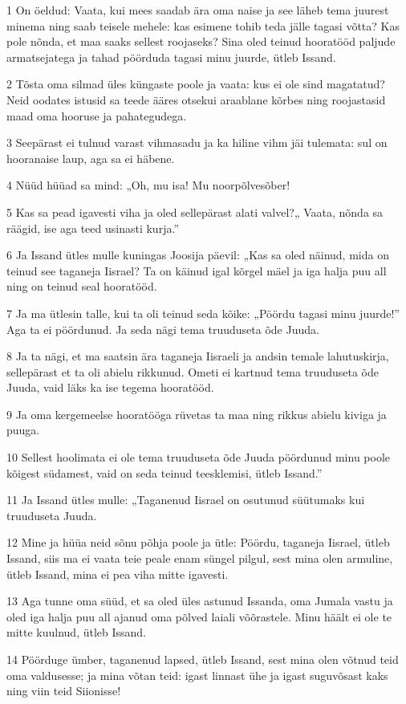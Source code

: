 \par 1 On öeldud: Vaata, kui mees saadab ära oma naise ja see läheb tema juurest minema ning saab teisele mehele: kas esimene tohib teda jälle tagasi võtta? Kas pole nõnda, et maa saaks sellest roojaseks? Sina oled teinud hooratööd paljude armatsejatega ja tahad pöörduda tagasi minu juurde, ütleb Issand.
\par 2 Tõsta oma silmad üles küngaste poole ja vaata: kus ei ole sind magatatud? Neid oodates istusid sa teede ääres otsekui araablane kõrbes ning roojastasid maad oma hooruse ja pahategudega.
\par 3 Seepärast ei tulnud varast vihmasadu ja ka hiline vihm jäi tulemata: sul on hooranaise laup, aga sa ei häbene.
\par 4 Nüüd hüüad sa mind: „Oh, mu isa! Mu noorpõlvesõber!
\par 5 Kas sa pead igavesti viha ja oled sellepärast alati valvel?„ Vaata, nõnda sa räägid, ise aga teed usinasti kurja.”
\par 6 Ja Issand ütles mulle kuningas Joosija päevil: „Kas sa oled näinud, mida on teinud see taganeja Iisrael? Ta on käinud igal kõrgel mäel ja iga halja puu all ning on teinud seal hooratööd.
\par 7 Ja ma ütlesin talle, kui ta oli teinud seda kõike: „Pöördu tagasi minu juurde!” Aga ta ei pöördunud. Ja seda nägi tema truuduseta õde Juuda.
\par 8 Ja ta nägi, et ma saatsin ära taganeja Iisraeli ja andsin temale lahutuskirja, sellepärast et ta oli abielu rikkunud. Ometi ei kartnud tema truuduseta õde Juuda, vaid läks ka ise tegema hooratööd.
\par 9 Ja oma kergemeelse hooratööga rüvetas ta maa ning rikkus abielu kiviga ja puuga.
\par 10 Sellest hoolimata ei ole tema truuduseta õde Juuda pöördunud minu poole kõigest südamest, vaid on seda teinud teesklemisi, ütleb Issand.”
\par 11 Ja Issand ütles mulle: „Taganenud Iisrael on osutunud süütumaks kui truuduseta Juuda.
\par 12 Mine ja hüüa neid sõnu põhja poole ja ütle: Pöördu, taganeja Iisrael, ütleb Issand, siis ma ei vaata teie peale enam süngel pilgul, sest mina olen armuline, ütleb Issand, mina ei pea viha mitte igavesti.
\par 13 Aga tunne oma süüd, et sa oled üles astunud Issanda, oma Jumala vastu ja oled iga halja puu all ajanud oma põlved laiali võõrastele. Minu häält ei ole te mitte kuulnud, ütleb Issand.
\par 14 Pöörduge ümber, taganenud lapsed, ütleb Issand, sest mina olen võtnud teid oma valdusesse; ja mina võtan teid: igast linnast ühe ja igast suguvõsast kaks ning viin teid Siionisse!
